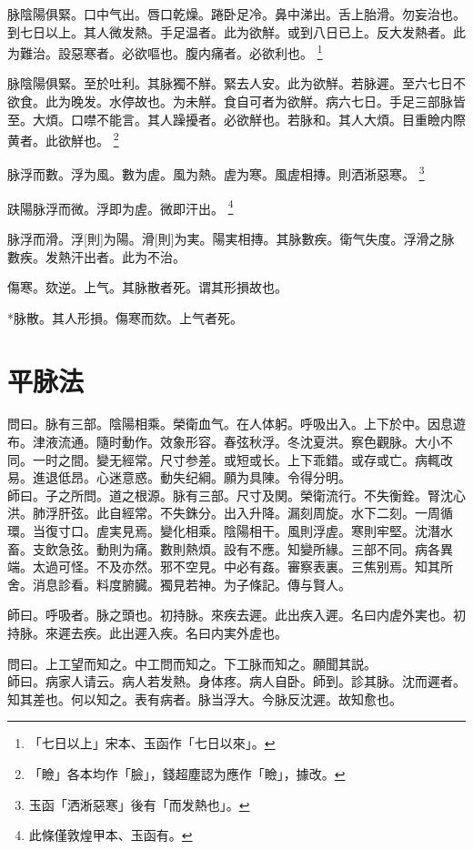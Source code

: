 \documentclass[12pt,twoside,UTF8,b5paper]{ctexbook}
\begin{document}
脉陰陽俱緊。口中气出。唇口乾燥。踡卧足冷。鼻中涕出。舌上胎滑。勿妄治也。到七日以上。其人微发熱。手足温者。此为欲觧。或到八日已上。反大发熱者。此为難治。設惡寒者。必欲嘔也。腹内痛者。必欲利也。
	\footnote{「七日以上」宋本、玉函作「七日以來」。}

脉陰陽俱緊。至於吐利。其脉獨不觧。緊去人安。此为欲觧。若脉遲。至六七日不欲食。此为晚发。水停故也。为未觧。食自可者为欲觧。病六七日。手足三部脉皆至。大煩。口噤不能言。其人躁擾者。必欲觧也。若脉和。其人大煩。目重瞼内際黄者。此欲觧也。
	\footnote{「瞼」各本均作「臉」，錢超塵認为應作「瞼」，據改。}

脉浮而數。浮为風。數为虗。風为熱。虗为寒。風虗相摶。則洒淅惡寒。
	\footnote{玉函「洒淅惡寒」後有「而发熱也」。}

趺陽脉浮而微。浮即为虗。微即汗出。
	\footnote{此條僅敦煌甲本、玉函有。}

脉浮而滑。浮[則]为陽。滑[則]为実。陽実相摶。其脉數疾。衛气失度。浮滑之脉數疾。发熱汗出者。此为不治。

傷寒。欬逆。上气。其脉散者死。谓其形損故也。

*脉散。其人形損。傷寒而欬。上气者死。

\chapter{平脉法}

問曰。脉有三部。陰陽相乘。榮衛血气。在人体躬。呼吸出入。上下於中。因息遊布。津液流通。隨时動作。效象形容。春弦秋浮。冬沈夏洪。察色觀脉。大小不同。一时之間。變无經常。尺寸参差。或短或长。上下乖錯。或存或亡。病輒改易。進退低昂。心迷意惑。動失纪綱。願为具陳。令得分明。\\
師曰。子之所問。道之根源。脉有三部。尺寸及関。榮衛流行。不失衡銓。腎沈心洪。肺浮肝弦。此自經常。不失銖分。出入升降。漏刻周旋。水下二刻。一周循環。当復寸口。虗実見焉。變化相乘。陰陽相干。風則浮虗。寒則牢堅。沈潛水畜。支飲急弦。動則为痛。數則熱煩。設有不應。知變所緣。三部不同。病各異端。太過可怪。不及亦然。邪不空見。中必有姦。審察表裏。三焦别焉。知其所舍。消息診看。料度腑臓。獨見若神。为子條記。傳与賢人。

師曰。呼吸者。脉之頭也。初持脉。來疾去遲。此出疾入遲。名曰内虗外実也。初持脉。來遲去疾。此出遲入疾。名曰内実外虗也。

問曰。上工望而知之。中工問而知之。下工脉而知之。願聞其説。\\
師曰。病家人请云。病人若发熱。身体疼。病人自卧。師到。診其脉。沈而遲者。知其差也。何以知之。表有病者。脉当浮大。今脉反沈遲。故知愈也。
\end{document}
